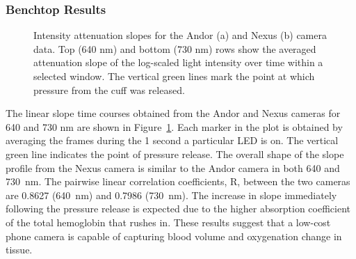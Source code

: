 \subsubsection{Benchtop Results}
\begin{figure}
    \begin{center}
    \end{center}
    \caption{Intensity attenuation slopes for the Andor (a) and Nexus (b) camera data. Top (640 nm) and bottom (730 nm) rows show the averaged attenuation slope of the log-scaled light intensity over time within a selected window. The vertical green lines mark the point at which pressure from the cuff was released.} 
    \label{fig:D2results}
\end{figure} 
The linear slope time courses obtained from the Andor and Nexus cameras for 640 and 730 nm are shown in Figure~\ref{fig:D2results}. Each marker in the plot is obtained by averaging the frames during the 1 second a particular LED is on. The vertical green line indicates the point of pressure release. The overall shape of the slope profile from the Nexus camera is similar to the Andor camera in both 640 and 730~nm. The pairwise linear correlation coefficients, R, between the two cameras are 0.8627 (640~nm) and 0.7986 (730~nm). The increase in slope immediately following the pressure release is expected due to the higher absorption coefficient of the total hemoglobin that rushes in. These results suggest that a low-cost phone camera is capable of capturing blood volume and oxygenation change in tissue. 



